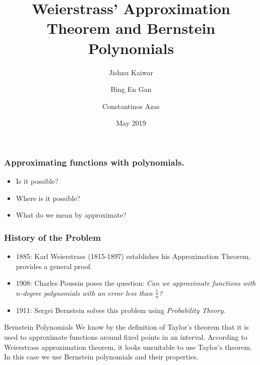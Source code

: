 \documentclass[mathserif,serif]{beamer}
\title{Weierstrass' Approximation Theorem and Bernstein Polynomials}
\author{Jishnu Kaiwar
  \and
  Bing En Gan
  \and
  Constantinos Azas}
\date{May 2019}
\begin{document}
\frame{\titlepage}

\begin{frame}
  \frametitle{Approximating functions with polynomials.}
  \begin{itemize}
  \item<+-> Is it possible?
  \item<+-> Where is it possible?
  \item<+-> What do we mean by approximate?

  \end{itemize}
\end{frame}

\begin{frame}
  \frametitle{History of the Problem}
  \begin{itemize}
  \item 1885: Karl Weierstrass (1815-1897) establishes his Approximation Theorem, provides a general proof.
  \item 1908: Charles Poussin poses the question: \emph{Can we approximate functions with $n$-degree polynomials with an error less than $\frac{1}{n}$?}
  \item 1911: Sergei Bernstein solves this problem using \emph{Probability Theory}.
  \end{itemize}
\end{frame}

\begin{frame}{Bernstein Polynomials}
We know by the definition of Taylor's theorem that it is used to approximate functions around fixed points in an interval. According to Weierstrass approximation theorem, it looks unsuitable to use Taylor's theorem. In this case we use Bernstein polynomials and their properties.    
\end{frame}
\end{document}
